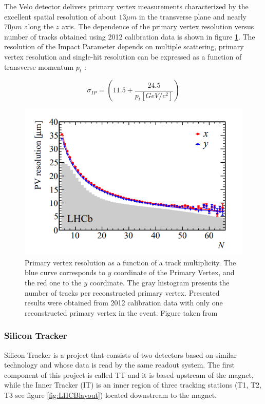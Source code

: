 The Velo detector delivers primary vertex measurements characterized by the excellent spatial resolution of about $13 \mu m $ in the transverse plane and nearly $70 \mu m $ along the $z$ axis. The dependence of the primary vertex resolution versus number of tracks obtained using 2012 calibration data is shown in figure \ref{fig:veloPerformance}. The resolution of the Impact Parameter depends on  multiple scattering, primary vertex resolution and single-hit resolution can be expressed as a function of transverse momentum $p_t$ \cite{veloPerformance}: 

\begin{equation}
    \sigma_{IP} = \left( 11.5  + \frac{24.5}{p_t[GeV/c^2]} \right)
\end{equation}



\begin{figure}[h]
\centering
\includegraphics{figures/VeloResolution.PNG}
\caption{Primary vertex resolution as a function of a track multiplicity. The blue curve corresponds to $y$ coordinate of the Primary Vertex, and the red one to the $y$ coordinate. The gray histogram presents the number of tracks per reconstructed primary vertex. Presented results were obtained from 2012 calibration data with only one reconstructed primary vertex in the event. Figure taken from \cite{veloPerformance} 
\label{fig:veloPerformance}}
\end{figure}

\subsubsection{Silicon Tracker}

Silicon Tracker is a project that consists of two detectors based on similar technology and whose data is read by the same readout system. The first component of this project is called TT and it is based upstream of the magnet, while the Inner Tracker (IT) is an inner region of three tracking stations (T1, T2, T3 see figure \ref{fig:LHCBlayout}) located downstream to the magnet.

